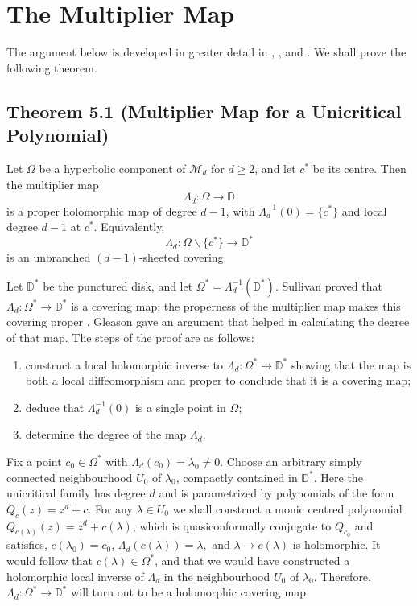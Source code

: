 \documentclass[11pt,a4paper]{article}
\begin{document}
\section*{The Multiplier Map}



    The argument below is developed in greater detail in \cite{branner2014quasiconformal}, \cite{MR812271}, and \cite{MR762431}. We shall prove the following theorem.

    \subsection*{Theorem 5.1 (Multiplier Map for a Unicritical Polynomial)}
    Let $\Omega$ be a hyperbolic component of $\mathcal{M}_d$ for $d\geq2$, and let $c^*$ be its centre. Then the multiplier map
    \[
    \Lambda_d:\Omega\longrightarrow\mathbb{D}
    \]
    is a proper holomorphic map of degree $d-1$, with $\Lambda_d^{-1}(0)=\{c^*\}$ and local degree $d-1$ at $c^*$. Equivalently,
    \[
    \Lambda_d:\Omega\backslash\{c^*\}\longrightarrow\mathbb{D}^*
    \]
    is an unbranched $(d-1)$-sheeted covering.



    Let $\mathbb{D}^*$ be the punctured disk, and let $\Omega^* = \Lambda_d^{-1}(\mathbb{D}^*)$. Sullivan proved that $\Lambda_d: \Omega^* \rightarrow \mathbb{D}^*$ is a covering map; the properness of the multiplier map makes this covering proper \cite{branner2014quasiconformal,MR812271,MR762431}. Gleason gave an argument that helped in calculating the degree of that map. The steps of the proof are as follows:
    \begin{enumerate}
        \item construct a local holomorphic inverse to $\Lambda_d: \Omega^* \rightarrow \mathbb{D}^*$ showing that the map is both a local diffeomorphism and proper to conclude that it is a covering map;
        \item deduce that $\Lambda_d^{-1}(0)$ is a single point in $\Omega$;
        \item determine the degree of the map $\Lambda_d$.
    \end{enumerate}


    Fix a point $c_0 \in \Omega^*$ with $\Lambda_d(c_0) = \lambda_0 \neq 0$. Choose an arbitrary simply connected neighbourhood $U_0$ of $\lambda_0$, compactly contained in $\mathbb{D}^*$. Here the unicritical family has degree $d$ and is parametrized by polynomials of the form $Q_c(z) = z^d +c$. For any $\lambda \in U_0$ we shall construct a monic centred polynomial $Q_{c(\lambda)}(z) = z^d + c(\lambda)$, which is quasiconformally conjugate to $Q_{c_0}$ and satisfies, $c(\lambda_0) = c_0$, $\Lambda_d(c(\lambda)) = \lambda,$ and $\lambda \rightarrow c(\lambda)$ is holomorphic. It would follow that $c(\lambda) \in \Omega^*$, and that we would have constructed a holomorphic local inverse of $\Lambda_d$ in the neighbourhood $U_0$ of $\lambda_0$. Therefore, $\Lambda_d: \Omega^* \rightarrow \mathbb{D}^*$ will turn out to be a holomorphic covering map.
\end{document}
